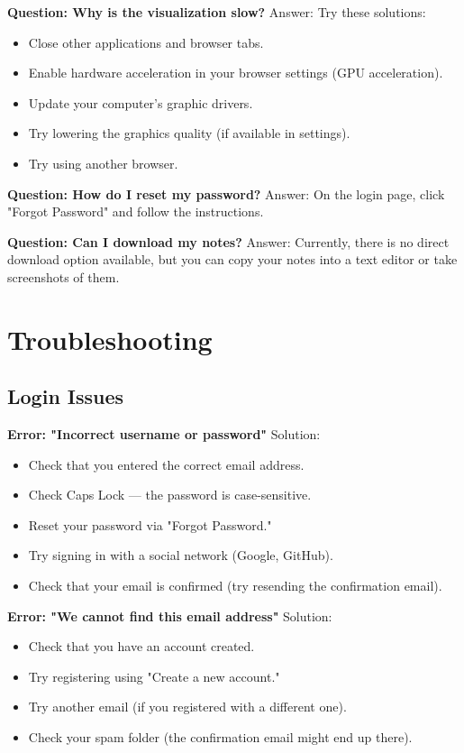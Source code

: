 \textbf{Question: Why is the visualization slow?}\newline
Answer: Try these solutions:
\begin{itemize}
  \item Close other applications and browser tabs.
  \item Enable hardware acceleration in your browser settings (GPU acceleration).
  \item Update your computer's graphic drivers.
  \item Try lowering the graphics quality (if available in settings).
  \item Try using another browser.
\end{itemize}

\textbf{Question: How do I reset my password?}\newline
Answer: On the login page, click "Forgot Password" and follow the instructions.

\textbf{Question: Can I download my notes?}\newline
Answer: Currently, there is no direct download option available, but you can copy your notes into a text editor or take screenshots of them.

\section{Troubleshooting}

\subsection{Login Issues}

\textbf{Error: "Incorrect username or password"}\newline
Solution:
\begin{itemize}
  \item Check that you entered the correct email address.
  \item Check Caps Lock — the password is case-sensitive.
  \item Reset your password via "Forgot Password."
  \item Try signing in with a social network (Google, GitHub).
  \item Check that your email is confirmed (try resending the confirmation email).
\end{itemize}

\textbf{Error: "We cannot find this email address"}\newline
Solution:
\begin{itemize}
  \item Check that you have an account created.
  \item Try registering using "Create a new account."
  \item Try another email (if you registered with a different one).
  \item Check your spam folder (the confirmation email might end up there).
\end{itemize}

